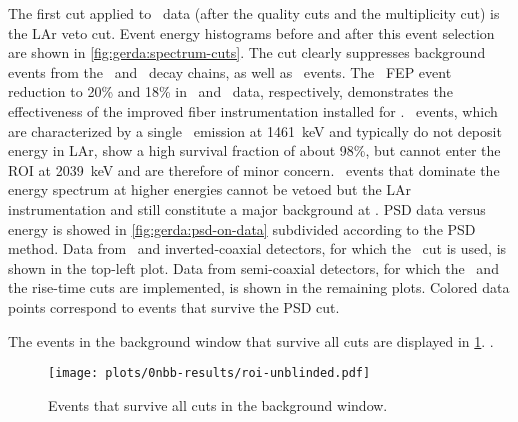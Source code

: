 The first cut applied to \phasetwo\ data (after the quality cuts and the multiplicity cut)
is the LAr veto cut.  Event energy histograms before and after this event selection are
shown in \cref{fig:gerda:spectrum-cuts}. The cut clearly suppresses background events from
the \Th\ and \Uh\ decay chains, as well as \kvz\ events. The \kvz\ FEP event reduction to
20\% and 18\% in \phasetwo\ and \phasetwop\ data, respectively, demonstrates the
effectiveness of the improved fiber instrumentation installed for \phasetwop. \kvn\
events, which are characterized by a single \g\ emission at 1461~keV and typically do not
deposit energy in LAr, show a high survival fraction of about 98\%, but cannot enter the
ROI at 2039~keV and are therefore of minor concern. \a\ events that dominate the energy
spectrum at higher energies cannot be vetoed but the LAr instrumentation and still
constitute a major background at \qbb.
\newpar
PSD data versus energy is showed in \cref{fig:gerda:psd-on-data} subdivided according to
the PSD method. Data from \bege\ and inverted-coaxial detectors, for which the \aoe\ cut
is used, is shown in the top-left plot. Data from semi-coaxial detectors, for which the
\annmse\ and the rise-time cuts are implemented, is shown in the remaining plots. Colored
data points correspond to events that survive the PSD cut.

The events in the background window that survive all cuts are displayed in
\cref{fig:gerda:roi}. .

\begin{figure}
  \centering
  \texttt{[image: plots/0nbb-results/roi-unblinded.pdf]}
  \caption{%
    Events that survive all cuts in the background window. 
  }\label{fig:gerda:roi}
\end{figure}

